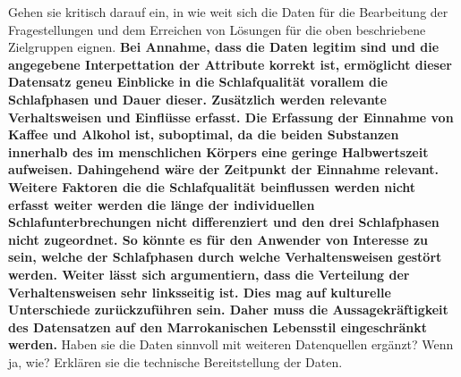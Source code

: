 \documentclass[usegeometry=true]{scrartcl}
\begin{document}
Gehen sie kritisch darauf ein, in wie weit sich die Daten für die Bearbeitung der Fragestellungen und dem Erreichen von Lösungen für die oben beschriebene Zielgruppen eignen.
\textbf{Bei Annahme, dass die Daten legitim sind und die  angegebene Interpettation der Attribute korrekt ist, ermöglicht dieser Datensatz geneu Einblicke in die Schlafqualität vorallem die Schlafphasen und Dauer dieser. Zusätzlich werden relevante Verhaltsweisen und Einflüsse erfasst. Die Erfassung der Einnahme von Kaffee und Alkohol ist, suboptimal, da die beiden Substanzen innerhalb des im menschlichen Körpers eine geringe Halbwertszeit aufweisen. Dahingehend wäre der Zeitpunkt der Einnahme relevant. Weitere Faktoren die die Schlafqualität beinflussen werden nicht erfasst weiter werden die länge der individuellen Schlafunterbrechungen nicht differenziert und den drei Schlafphasen nicht zugeordnet. So könnte es für den Anwender von Interesse zu sein, welche der Schlafphasen durch welche Verhaltensweisen gestört werden. Weiter lässt sich argumentiern, dass die Verteilung der Verhaltensweisen sehr linksseitig ist. Dies mag auf kulturelle Unterschiede zurückzuführen sein. Daher muss die Aussagekräftigkeit des Datensatzen auf den Marrokanischen Lebensstil eingeschränkt werden.}
 Haben sie die Daten sinnvoll mit weiteren Datenquellen ergänzt? Wenn ja, wie?
Erklären sie die technische Bereitstellung der Daten.
\end{document}
